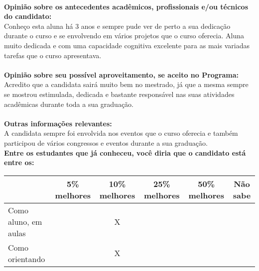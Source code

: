 \documentclass[11pt]{article}
\begin{document}
\\
\textbf{Opinião sobre os antecedentes acadêmicos, profissionais e/ou técnicos do candidato:}
\\Conheço esta aluna há 3 anos e sempre pude ver de perto a sua dedicação durante o curso e se envolvendo em vários projetos que o curso oferecia. Aluna muito dedicada e com uma capacidade cognitiva excelente para as mais variadas tarefas que o curso apresentava.\\
\\
\textbf{Opinião sobre seu possível aproveitamento, se aceito no Programa:}
\\Acredito que a candidata sairá muito bem no mestrado, já que a mesma sempre se mostrou estimulada, dedicada e bastante responsável nas suas atividades acadêmicas durante toda a sua graduação.\\ 
\\
\textbf{Outras informações relevantes:} \\A candidata sempre foi envolvida nos eventos que o curso oferecia e também participou de vários congressos e eventos durante a sua graduação.
\\[0.3cm]
\textbf{Entre os estudantes que já conheceu, você diria que o candidato está entre os:}
\\
\begin{tabular}{|l|c|c|c|c|c|}
\hline
 & 5\% melhores & 10\% melhores & 25\% melhores & 50\% melhores & Não sabe \\
\hline
Como aluno, em aulas &  & X &  &  & \\
\hline
Como orientando &  & X &  &  & \\
\hline
\end{tabular}
\end{document}
